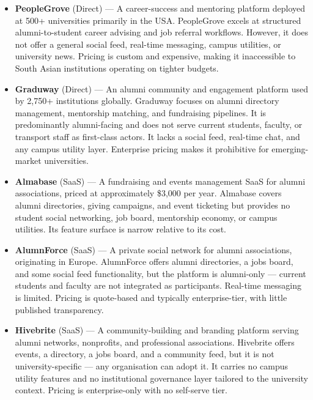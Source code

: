 \documentclass[12pt, a4paper]{article}
\begin{document}
\begin{itemize}
    \item \textbf{PeopleGrove} (Direct) --- A career-success and mentoring platform
    deployed at 500+ universities primarily in the USA. PeopleGrove excels at
    structured alumni-to-student career advising and job referral workflows. However,
    it does not offer a general social feed, real-time messaging, campus utilities,
    or university news. Pricing is custom and expensive, making it inaccessible to
    South Asian institutions operating on tighter budgets.

    \item \textbf{Graduway} (Direct) --- An alumni community and engagement platform
    used by 2,750+ institutions globally. Graduway focuses on alumni directory
    management, mentorship matching, and fundraising pipelines. It is predominantly
    alumni-facing and does not serve current students, faculty, or transport staff as
    first-class actors. It lacks a social feed, real-time chat, and any campus
    utility layer. Enterprise pricing makes it prohibitive for emerging-market
    universities.

    \item \textbf{Almabase} (SaaS) --- A fundraising and events management SaaS for
    alumni associations, priced at approximately \$3,000 per year. Almabase covers
    alumni directories, giving campaigns, and event ticketing but provides no student
    social networking, job board, mentorship economy, or campus utilities.
    Its feature surface is narrow relative to its cost.

    \item \textbf{AlumnForce} (SaaS) --- A private social network for alumni
    associations, originating in Europe. AlumnForce offers alumni directories, a
    jobs board, and some social feed functionality, but the platform is alumni-only
    --- current students and faculty are not integrated as participants. Real-time
    messaging is limited. Pricing is quote-based and typically enterprise-tier,
    with little published transparency.

    \item \textbf{Hivebrite} (SaaS) --- A community-building and branding platform
    serving alumni networks, nonprofits, and professional associations. Hivebrite
    offers events, a directory, a jobs board, and a community feed, but it is not
    university-specific --- any organisation can adopt it. It carries no campus
    utility features and no institutional governance layer tailored to the
    university context. Pricing is enterprise-only with no self-serve tier.
\end{itemize}
\end{document}
